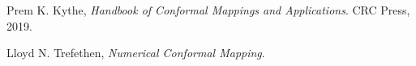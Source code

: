 \documentclass[12pt,a4paper]{article}
\begin{document}
\vspace{0.8cm}

\begin{enumerate}[label={[\arabic*]}]
\item Prem K. Kythe, \textit{Handbook of Conformal Mappings and Applications}. CRC Press, 2019.
\item Lloyd N. Trefethen, \textit{Numerical Conformal Mapping}.
\end{enumerate}
\end{document}
